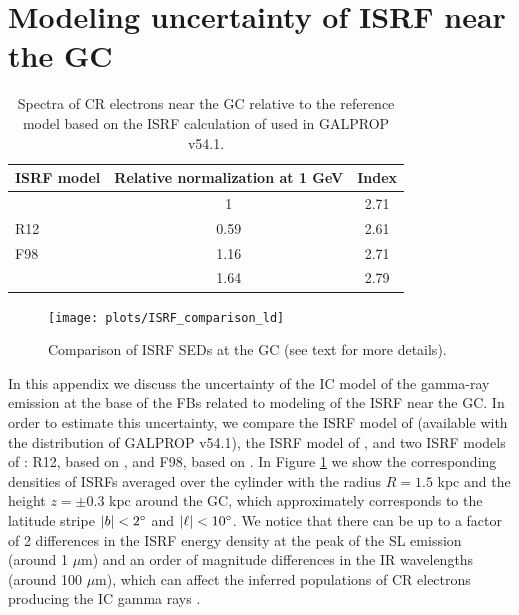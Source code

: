 \section{Modeling uncertainty of ISRF near the GC} 

\begin{table}
  \begin{center}
    \caption{\label{tab:CRe_syst} 
Spectra of CR electrons near the GC relative to the reference model based on the ISRF calculation of \cite{Porter:2008ve} used in GALPROP v54.1.
}
\begin{tabular}{| l |c|c|} %
\hline
ISRF model & Relative normalization at 1 GeV  & Index \\
\hline
\cite{Porter:2008ve} & 1 & 2.71 \\ 
\cite{2017ApJ...846...67P} R12 & 0.59 & 2.61 \\ 
\cite{2017ApJ...846...67P} F98 & 1.16 & 2.71 \\ 
\cite{2017MNRAS.470.2539P} & 1.64 & 2.79 \\ 
 \hline
    \end{tabular}
  \end{center}
\end{table}


\begin{figure}[h]
\centering
\texttt{[image: plots/ISRF\_comparison\_ld]}
\caption{Comparison of ISRF SEDs at the GC (see text for more details).}
\label{fig:isrfs}
\end{figure}

In this appendix we discuss the uncertainty of the IC model of the gamma-ray emission at the base of the FBs 
related to modeling of the ISRF near the GC.
In order to estimate this uncertainty, we compare the ISRF model of 
\cite{Porter:2008ve} (available with the distribution of GALPROP v54.1),
the ISRF model of \cite{2017MNRAS.470.2539P},
and two ISRF models of \cite{2017ApJ...846...67P}: 
R12, based on \cite{2012A&A...545A..39R},
and F98, based on \cite{1998ApJ...492..495F}.
In Figure \ref{fig:isrfs} we show the corresponding densities of ISRFs averaged over the cylinder with the 
radius $R = 1.5$ kpc and the height $z = \pm 0.3$ kpc around the GC, which approximately corresponds 
to the latitude stripe $|b| < 2^\circ$ and $|\ell| < 10^\circ$.
We notice that there can be up to a factor of 2 differences in the ISRF energy density at the peak 
of the SL emission (around 1 $\mu$m) 
and an order of magnitude differences in the IR wavelengths (around 100 $\mu$m),
which can affect the inferred populations of CR electrons producing the IC gamma rays 
\citep[see also][]{2017ApJ...846...67P, 2019APh...107....1N}.


